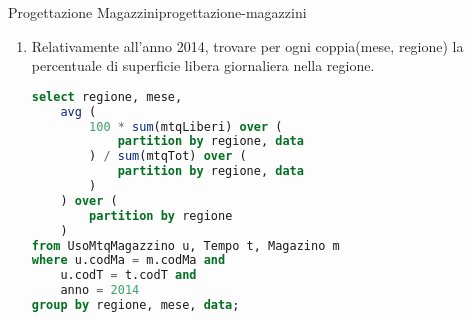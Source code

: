 \documentclass[12pt]{article}
\begin{document}
\begin{problem}{Progettazione Magazzini}{progettazione-magazzini}
\begin{enumerate}
\begin{lstlisting}[language=sql]
    avg(
        sum(valoreTotProdotti) over (
            partition by regione, data
        )
    ) over (
        parition by regione, mese
    ) as valoreMedioGiornalieroComplessivo
from UsoProdMagazzino u, Tempo t, Magazzino m
where u.codMa = m.codMa and
    u.codT = t.codT and
    anno = 2015
group by regione, mese, data;
\end{lstlisting}
        \item Relativamente all’anno 2014, trovare per ogni coppia(mese, regione) la percentuale di superficie libera giornaliera nella regione.
\begin{lstlisting}[language=sql]
select regione, mese,
    avg (
        100 * sum(mtqLiberi) over (
            partition by regione, data
        ) / sum(mtqTot) over (
            partition by regione, data
        )
    ) over (
        partition by regione
    )
from UsoMtqMagazzino u, Tempo t, Magazino m
where u.codMa = m.codMa and
    u.codT = t.codT and
    anno = 2014
group by regione, mese, data;
\end{lstlisting}
    \end{enumerate}
\end{problem}
\end{document}
